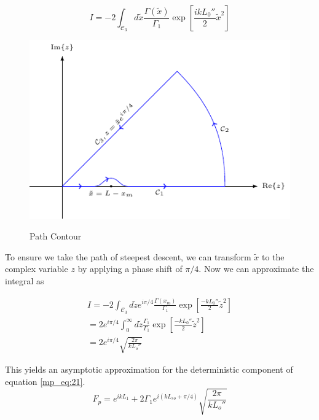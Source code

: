 \begin{equation}
I = -2\int_{\mathcal{C}_3}d\tilde{x} \frac{\Gamma(\tilde{x})}{\Gamma_1}\exp\left[\frac{ikL_0''}{2}\tilde{x}^2\right]  
\label{mp_eq:24}
\end{equation}

\begin{figure}[H]
  \begin{center}
\includegraphics[width=5in]{../media/path_contour-figure0.pdf}
  \end{center}
  \renewcommand{\baselinestretch}{1} \small\normalsize
  \begin{quote}
    \caption[Path Contour]{ Path Contour\label{mp_fig:6}}
  \end{quote}
\end{figure}
\renewcommand{\baselinestretch}{2} \small\normalsize

To ensure we take the path of steepest descent, we can transform $\tilde{x}$ to the complex variable $z$ by applying a phase shift of $\pi/4$. Now we can approximate the integral as

\begin{equation}
\begin{gathered}
I = -2\int_{\mathcal{C}_3}d\tilde{z}e^{i\pi/4} \frac{\Gamma(x_m)}{\Gamma_1}\exp\left[\frac{-kL_0''}{2}\tilde{z}^2\right]  \\
= 2e^{i\pi/4}\int_{0}^{\infty}d\tilde{z}\frac{\Gamma_1}{\Gamma_1}\exp\left[\frac{-kL_0''}{2}\tilde{z}^2\right]  \\
= 2e^{i\pi/4}\sqrt{\frac{2\pi}{kL_o''}}
\end{gathered}
\label{mp_eq:25}
\end{equation}

This yields an asymptotic approximation for the deterministic component of equation \ref{mp_eq:21}.
\begin{equation}
\boxed{F_p = e^{ikL_1} +2\Gamma_1 e^{i\left(kL_{so} + \pi/4\right)}\sqrt{\frac{2\pi}{kL_o''}}}
\label{mp_eq:26}
\end{equation}
